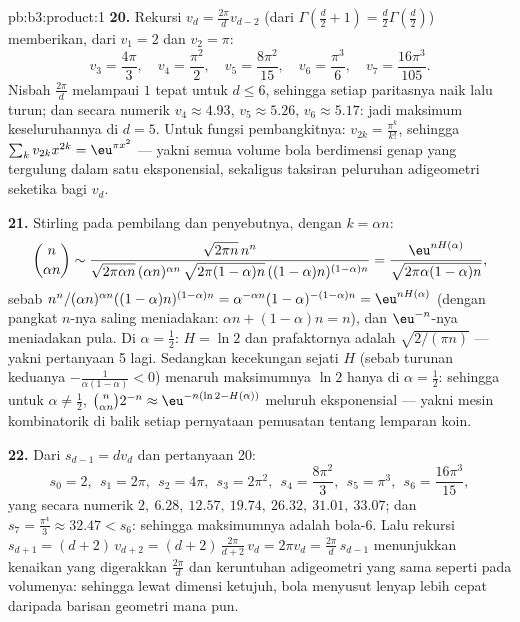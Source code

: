 \begin{solution}{pb:b3:product:1}
\textbf{20.} Rekursi $v_d = \frac{2\pi}dv_{d-2}$
(dari $\Gamma(\frac d2 + 1) = \frac d2\Gamma(\frac d2)$)
memberikan, dari $v_1 = 2$ dan $v_2 = \pi$:
\[
v_3 = \frac{4\pi}3,\quad v_4 = \frac{\pi^2}2,\quad
v_5 = \frac{8\pi^2}{15},\quad v_6 = \frac{\pi^3}6,\quad
v_7 = \frac{16\pi^3}{105}.
\]
Nisbah $\frac{2\pi}d$ melampaui $1$ tepat untuk $d \leq 6$,
sehingga setiap paritasnya naik lalu turun; dan secara numerik $v_4
\approx 4.93$, $v_5 \approx 5.26$, $v_6 \approx 5.17$: jadi
maksimum keseluruhannya di $d = 5$. Untuk fungsi pembangkitnya: $v_{2k} =
\frac{\pi^k}{k!}$, sehingga $\sum_kv_{2k}x^{2k} =
\eu^{\pi x^2}$ --- yakni semua volume bola berdimensi genap yang tergulung
dalam satu eksponensial, sekaligus taksiran peluruhan adigeometri
seketika bagi $v_d$.

\textbf{21.} Stirling pada pembilang dan penyebutnya, dengan $k =
\alpha n$:
\[
\binom n{\alpha n} \sim
\frac{\sqrt{2\pi n}\,n^n}
{\sqrt{2\pi\alpha n}\,(\alpha n)^{\alpha n}\,
\sqrt{2\pi(1-\alpha)n}\,((1-\alpha)n)^{(1-\alpha)n}}
= \frac{\eu^{nH(\alpha)}}{\sqrt{2\pi\alpha(1-\alpha)n}},
\]
sebab $n^n/(\alpha n)^{\alpha n}((1-\alpha)n)^{(1-\alpha)n} =
\alpha^{-\alpha n}(1-\alpha)^{-(1-\alpha)n} =
\eu^{nH(\alpha)}$ (dengan pangkat $n$-nya saling meniadakan: $\alpha n +
(1-\alpha)n = n$), dan $\eu^{-n}$-nya meniadakan pula. Di
$\alpha = \frac12$: $H = \ln2$ dan prafaktornya adalah
$\sqrt{2/(\pi n)}$ --- yakni pertanyaan 5 lagi. Sedangkan kecekungan sejati
$H$ (sebab turunan keduanya $-\frac1{\alpha(1-\alpha)} < 0$)
menaruh maksimumnya $\ln 2$ hanya di $\alpha = \frac12$: sehingga untuk
$\alpha \neq \frac12$, $\binom n{\alpha n}2^{-n} \approx
\eu^{-n(\ln2 - H(\alpha))}$ meluruh eksponensial --- yakni
mesin kombinatorik di balik setiap pernyataan pemusatan
tentang lemparan koin.

\textbf{22.} Dari $s_{d-1} = dv_d$ dan pertanyaan 20:
\[
s_0 = 2,\ \ s_1 = 2\pi,\ \ s_2 = 4\pi,\ \ s_3 = 2\pi^2,\ \
s_4 = \frac{8\pi^2}3,\ \ s_5 = \pi^3,\ \ s_6 =
\frac{16\pi^3}{15},
\]
yang secara numerik $2,\ 6.28,\ 12.57,\ 19.74,\ 26.32,\ 31.01,\
33.07$; dan $s_7 = \frac{\pi^4}3 \approx 32.47 < s_6$: sehingga
maksimumnya adalah bola-$6$. Lalu rekursi $s_{d+1} =
(d+2)\,v_{d+2} = (d+2)\,\frac{2\pi}{d+2}\,v_d = 2\pi v_d =
\frac{2\pi}d\,s_{d-1}$ menunjukkan kenaikan yang digerakkan $\frac{2\pi}d$
dan keruntuhan adigeometri yang sama seperti pada volumenya: sehingga lewat dimensi
ketujuh, bola menyusut lenyap lebih cepat daripada barisan geometri
mana pun.


\end{solution}

